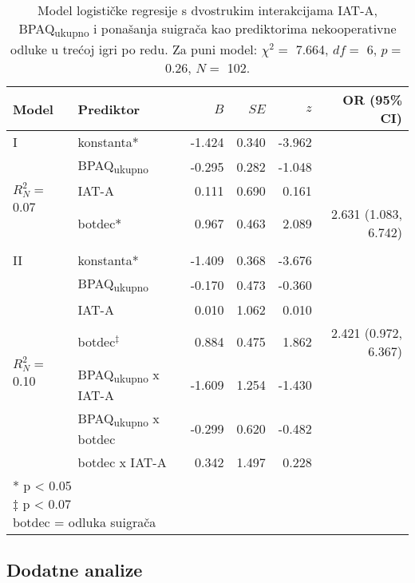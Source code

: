 \documentclass[a4paper, 12pt]{report}
\begin{document}
\begin{table}
    \begin{center}
        \caption{\label{glmtotgam33} Model logističke regresije s dvostrukim
            interakcijama IAT-A,
            BPAQ\textsubscript{ukupno} i ponašanja suigrača kao prediktorima
            nekooperativne odluke u trećoj igri po redu. Za puni
            model: $\chi^2 =$
            7.664, $df =$ 6, $p =$ 0.26, $N =$ 102.}
        \hspace*{-0.5cm}\begin{tabular}{llrrrr}
        \toprule
        Model & Prediktor & $B$ & $SE$ & $z$ & OR (95\% CI)\\
        \midrule
        I & konstanta* & -1.424 & 0.340 & -3.962 &\\
        \multirow{3}{*}{$R^2_N =$ 0.07}
        &BPAQ\textsubscript{ukupno} & -0.295 & 0.282 & -1.048 &\\
        &IAT-A & 0.111 & 0.690 & 0.161 &\\
        &botdec* & 0.967 & 0.463 & 2.089 & 2.631 (1.083, 6.742)\\
        &&&&&\\ 
        II & konstanta* & -1.409 & 0.368 & -3.676 & \\
        \multirow{6}{*}{$R^2_N =$ 0.10}
        &BPAQ\textsubscript{ukupno} & -0.170 & 0.473 & -0.360 & \\
        &IAT-A & 0.010 & 1.062 & 0.010 &\\
        &botdec$^\ddagger$ & 0.884 & 0.475 & 1.862  & 2.421 (0.972, 6.367)\\
        &BPAQ\textsubscript{ukupno} x IAT-A & -1.609 & 1.254 & -1.430 & \\
        &BPAQ\textsubscript{ukupno} x botdec & -0.299 & 0.620 & -0.482 & \\
        &botdec x IAT-A & 0.342 & 1.497 & 0.228 & \\
        \bottomrule
        \multicolumn{5}{l}{
            \parbox{3cm}{\scriptsize \vspace{3pt} 
                * p < 0.05\\
                $\ddagger$  p < 0.07\\
                botdec = odluka suigrača
        }}
    \end{tabular}
\end{center}
\end{table}

\subsection{Dodatne analize}
\end{document}
